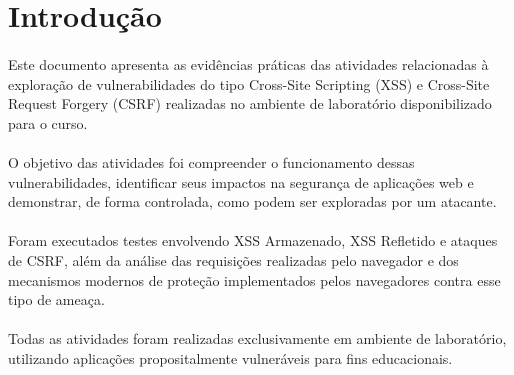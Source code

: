 \section{Introdução}

\paragraph{}
Este documento apresenta as evidências práticas das atividades relacionadas à
exploração de vulnerabilidades do tipo Cross-Site Scripting (XSS) e Cross-Site
Request Forgery (CSRF) realizadas no ambiente de laboratório disponibilizado
para o curso.

\paragraph{}
O objetivo das atividades foi compreender o funcionamento dessas
vulnerabilidades, identificar seus impactos na segurança de aplicações web e
demonstrar, de forma controlada, como podem ser exploradas por um atacante.

\paragraph{}
Foram executados testes envolvendo XSS Armazenado, XSS Refletido e ataques de
CSRF, além da análise das requisições realizadas pelo navegador e dos
mecanismos modernos de proteção implementados pelos navegadores contra esse
tipo de ameaça.

\paragraph{}
Todas as atividades foram realizadas exclusivamente em ambiente de laboratório,
utilizando aplicações propositalmente vulneráveis para fins educacionais.
